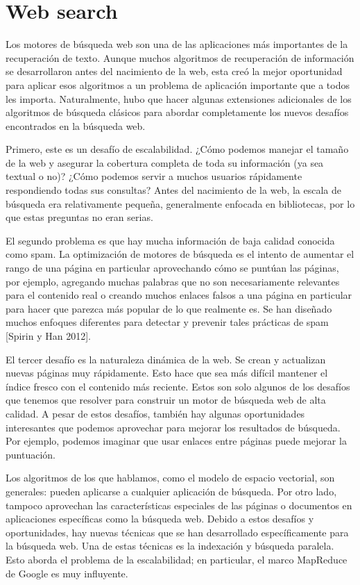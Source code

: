 \chapter{Web search}\label{Chapter8} 

Los motores de búsqueda web son una de las aplicaciones más importantes de la recuperación de texto. Aunque muchos algoritmos de recuperación de información se desarrollaron antes del nacimiento de la web, esta creó la mejor oportunidad para aplicar esos algoritmos a un problema de aplicación importante que a todos les importa. Naturalmente, hubo que hacer algunas extensiones adicionales de los algoritmos de búsqueda clásicos para abordar completamente los nuevos desafíos encontrados en la búsqueda web.

Primero, este es un desafío de escalabilidad. ¿Cómo podemos manejar el tamaño de la web y asegurar la cobertura completa de toda su información (ya sea textual o no)? ¿Cómo podemos servir a muchos usuarios rápidamente respondiendo todas sus consultas? Antes del nacimiento de la web, la escala de búsqueda era relativamente pequeña, generalmente enfocada en bibliotecas, por lo que estas preguntas no eran serias.

El segundo problema es que hay mucha información de baja calidad conocida como spam. La optimización de motores de búsqueda es el intento de aumentar el rango de una página en particular aprovechando cómo se puntúan las páginas, por ejemplo, agregando muchas palabras que no son necesariamente relevantes para el contenido real o creando muchos enlaces falsos a una página en particular para hacer que parezca más popular de lo que realmente es. Se han diseñado muchos enfoques diferentes para detectar y prevenir tales prácticas de spam [Spirin y Han 2012].

El tercer desafío es la naturaleza dinámica de la web. Se crean y actualizan nuevas páginas muy rápidamente. Esto hace que sea más difícil mantener el índice fresco con el contenido más reciente. Estos son solo algunos de los desafíos que tenemos que resolver para construir un motor de búsqueda web de alta calidad. A pesar de estos desafíos, también hay algunas oportunidades interesantes que podemos aprovechar para mejorar los resultados de búsqueda. Por ejemplo, podemos imaginar que usar enlaces entre páginas puede mejorar la puntuación.

Los algoritmos de los que hablamos, como el modelo de espacio vectorial, son generales: pueden aplicarse a cualquier aplicación de búsqueda. Por otro lado, tampoco aprovechan las características especiales de las páginas o documentos en aplicaciones específicas como la búsqueda web. Debido a estos desafíos y oportunidades, hay nuevas técnicas que se han desarrollado específicamente para la búsqueda web. Una de estas técnicas es la indexación y búsqueda paralela. Esto aborda el problema de la escalabilidad; en particular, el marco MapReduce de Google es muy influyente.

